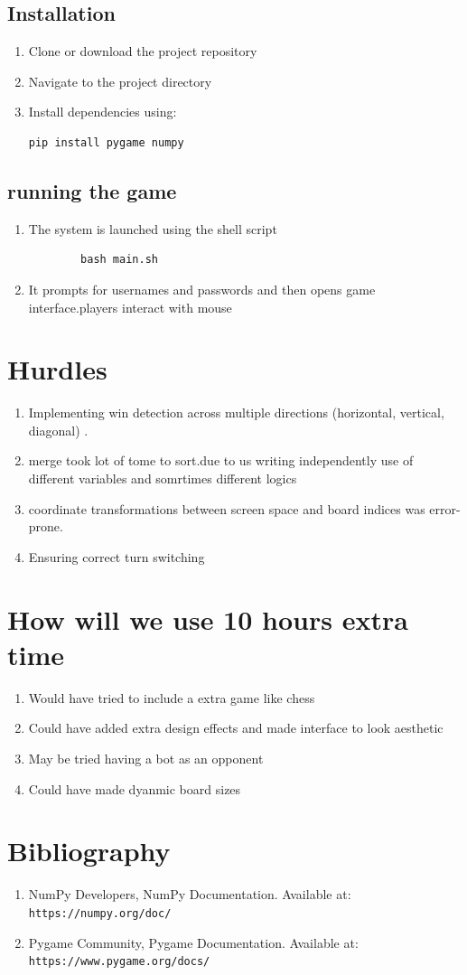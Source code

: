 \documentclass{article}
\begin{document}
\subsection{Installation}
\begin{enumerate}
    \item Clone or download the project repository
    \item Navigate to the project directory
    \item Install dependencies using:
\begin{verbatim}
pip install pygame numpy
\end{verbatim}
\end{enumerate}
\subsection{running the game}
\begin{enumerate}
    \item The system is launched using the shell script
    \begin{verbatim}
        bash main.sh
    \end{verbatim}
    \item It prompts for usernames and passwords and then opens game interface.players interact with mouse 
\end{enumerate}
\section{Hurdles}
\begin{enumerate}
    \item Implementing win detection across multiple directions (horizontal, vertical, diagonal) .
    \item merge took lot of tome to sort.due to us writing independently use of different variables and somrtimes different logics
    \item coordinate transformations between screen space and board indices was error-prone.
    \item Ensuring correct turn switching
\end{enumerate}
\section{How will we use 10 hours extra time}
\begin{enumerate}
    \item Would have tried to include a extra game like chess
    \item Could have added extra design effects and made interface to look aesthetic
    \item May be tried having a bot as an opponent 
    \item Could have made dyanmic board sizes
\end{enumerate}
\section{Bibliography}
\begin{enumerate}
 \item NumPy Developers, NumPy Documentation.  
    Available at: \texttt{https://numpy.org/doc/}

 \item Pygame Community, Pygame Documentation.  
    Available at: \texttt{https://www.pygame.org/docs/}
\end{enumerate}
\end{document}

